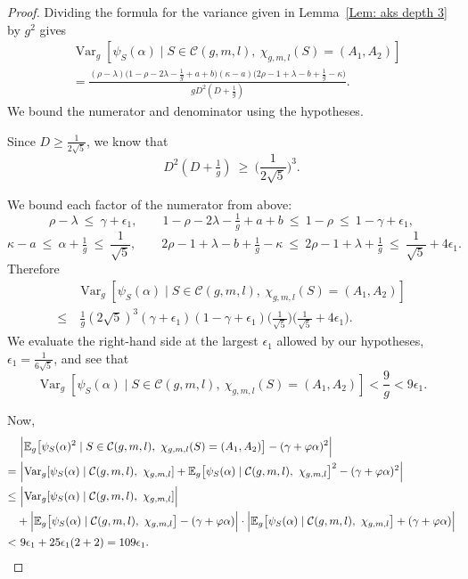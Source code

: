 \documentclass[10pt,a4paper]{amsart}
\def\E{{\mathbb E}}
\def\Var{{\operatorname{Var}}}
\newcommand{\cC}{\mathcal{C}}
\renewcommand{\phi}{\varphi}
\begin{document}
\begin{proof}
Dividing the formula for the variance given in Lemma~\ref{Lem: aks depth 3} by $g^2$ gives
\begin{align*}
&\Var_g[\psi_S(\alpha)\mid S\in\cC(g,m,l),\ \chi_{g,m,l}(S)=(A_1,A_2)]\\
&=\frac{(\rho-\lambda)\bigl(1-\rho-2\lambda-\tfrac1g+a+b\bigr)
(\kappa-a)\bigl(2\rho-1+\lambda-b+\tfrac1g-\kappa\bigr)}
{gD^2(D+\tfrac1g)}.    
\end{align*}
We bound the numerator and denominator using the hypotheses.


Since $D\geq \frac{1}{2\sqrt{5}}$, we know that
\[D^2(D+\tfrac1g)\ \ge\ \Big(\frac1{2\sqrt5}\Big)^3.\]

We bound each factor of the numerator from above:
\[
\rho-\lambda\ \le\ \gamma+\epsilon_1,\qquad
1-\rho-2\lambda-\tfrac1g+a+b\ \le\ 1-\rho\ \le\ 1-\gamma+\epsilon_1,
\]
\[
\kappa-a\ \le\ \alpha+\tfrac1g\ \le\ \frac1{\sqrt5},\qquad
2\rho-1+\lambda-b+\tfrac1g-\kappa\ \le\ 2\rho-1+\lambda+\tfrac1g
\ \le\ \frac1{\sqrt5}+4\epsilon_1.
\]
Therefore
\begin{align*}
&\Var_g[\psi_S(\alpha)\mid S\in\cC(g,m,l),\ \chi_{g,m,l}(S)=(A_1,A_2)]\\
\le &\ \frac{1}{g}(2\sqrt5)^3
(\gamma+\epsilon_1)(1-\gamma+\epsilon_1)\Big(\frac1{\sqrt5}\Big)
\Big(\frac1{\sqrt5}+4\epsilon_1\Big).
\end{align*}
We evaluate the right-hand side at the largest $\epsilon_1$ allowed by our hypotheses, 
$\epsilon_1=\frac{1}{6\sqrt5}$, and see that
\[
\Var_g[\psi_S(\alpha)\mid S\in\cC(g,m,l),\ \chi_{g,m,l}(S)=(A_1,A_2)]<\frac{9}{g}< 9\epsilon_1.
\]

Now,
\begin{align*}
&\  \Bigl|\E_g \big[\psi_S(\alpha)^2\mid S\in\cC(g,m,l),\ \chi_{g,m,l}(S)=(A_1,A_2)\big]-(\gamma+\phi\alpha)^2\Bigr|\\
= &\  \Bigl| \Var_g[\psi_S(\alpha)\mid \cC(g,m,l),\ \chi_{g,m,l}] +\E_g \big[\psi_S(\alpha)\mid \cC(g,m,l),\ \chi_{g,m,l}\big]^2 -(\gamma+\phi\alpha)^2\Bigr|\\
\leq &\ \Bigl| \Var_g[\psi_S(\alpha)\mid \cC(g,m,l),\ \chi_{g,m,l}] \Bigr|\\
 &+\Bigl|\E_g \big[\psi_S(\alpha)\mid \cC(g,m,l),\ \chi_{g,m,l}\big] -(\gamma+\phi\alpha)\Bigr|
\cdot \Bigl|\E_g \big[\psi_S(\alpha)\mid \cC(g,m,l),\ \chi_{g,m,l}\big] +(\gamma+\phi\alpha)\Bigr|\\
< &\ 9\epsilon_1 + 25\epsilon_1 (2+2)
=109\epsilon_1.\qedhere
\end{align*}
\end{proof}
\end{document}
